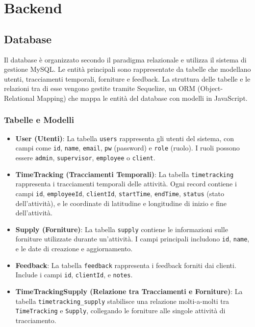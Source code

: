\documentclass[twoside]{supsistudent}
\begin{document}
\section{Backend}
\subsection{Database}
Il database è organizzato secondo il paradigma relazionale e utilizza il sistema di gestione MySQL. Le entità principali sono rappresentate da tabelle che modellano utenti, tracciamenti temporali, forniture e feedback. La struttura delle tabelle e le relazioni tra di esse vengono gestite tramite Sequelize, un ORM (Object-Relational Mapping) che mappa le entità del database con modelli in JavaScript.

\subsubsection{Tabelle e Modelli}
\begin{itemize}
  \item \textbf{User (Utenti)}: La tabella \texttt{users} rappresenta gli utenti del sistema, con campi come \texttt{id}, \texttt{name}, \texttt{email}, \texttt{pw} (password) e \texttt{role} (ruolo). I ruoli possono essere \texttt{admin}, \texttt{supervisor}, \texttt{employee} o \texttt{client}.
  \item \textbf{TimeTracking (Tracciamenti Temporali)}: La tabella \texttt{timetracking} rappresenta i tracciamenti temporali delle attività. Ogni record contiene i campi \texttt{id}, \texttt{employeeId}, \texttt{clientId}, \texttt{startTime}, \texttt{endTime}, \texttt{status} (stato dell'attività), e le coordinate di latitudine e longitudine di inizio e fine dell'attività.
  \item \textbf{Supply (Forniture)}: La tabella \texttt{supply} contiene le informazioni sulle forniture utilizzate durante un'attività. I campi principali includono \texttt{id}, \texttt{name}, e le date di creazione e aggiornamento.
  \item \textbf{Feedback}: La tabella \texttt{feedback} rappresenta i feedback forniti dai clienti. Include i campi \texttt{id}, \texttt{clientId}, e \texttt{notes}.
  \item \textbf{TimeTrackingSupply (Relazione tra Tracciamenti e Forniture)}: La tabella \texttt{timetracking\_supply} stabilisce una relazione molti-a-molti tra \texttt{TimeTracking} e \texttt{Supply}, collegando le forniture alle singole attività di tracciamento.
\end{itemize}
\end{document}
